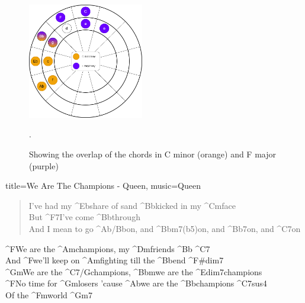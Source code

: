\begin{figure}[h]
	\centering
	\includegraphics[width=0.45\textwidth]{../../Images/CircleOfFifthsCminorFmajor.png}
	\caption{Showing the overlap of the chords in C minor (orange) and F major (purple)}.
	\label{fig:circle_of_fith_overlap_c_minor_f_major}
\end{figure}


\begin{song}[align-chords=l]{title={We Are The Champions - Queen}, music={Queen}} \label{song:we_are_the_champions_queen}
	\begin{verse}
		I've had my ^{Eb}share of sand ^{Bb}kicked in my ^{Cm}face \\
		But ^{F7}I've come ^{Bb}through \\
		And I mean to go ^{Ab/Bb}on, and ^{Bbm7(b5)}on, and ^{Bb7}on, and ^{C7}on \\
	\end{verse}
	
	\begin{chorus}
		^{F}We are the ^{Am}champions, my ^{Dm}friends ^{Bb} ^{C7} \\
		And ^{F}we'll keep on ^{Am}fighting till the ^{Bb}end ^{F#dim7} \\
		^{Gm}We are the ^{C7/G}champions, ^{Bbm}we are the ^{Edim7}champions \\
		^{F}No time for ^{Gm}losers 'cause ^{Ab}we are the ^{Bb}champions ^{C7sus4} \\
		Of the ^{Fm}world ^{Gm7}
 	\end{chorus}
\end{song}

\newpage

